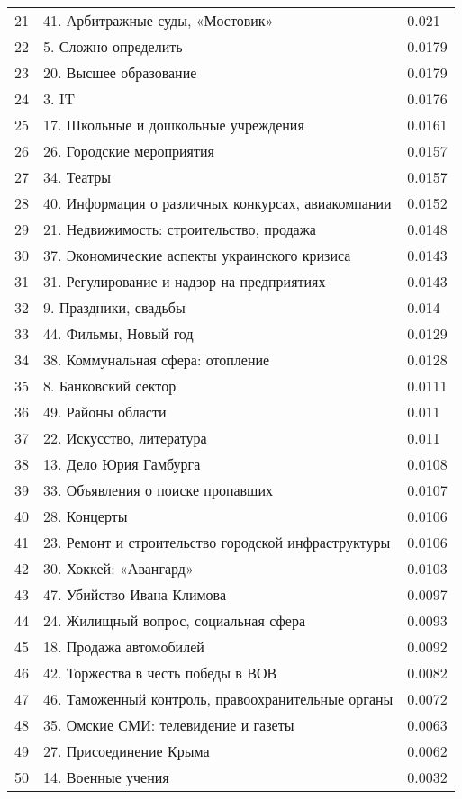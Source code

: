 \begin{longtable}[c]{| L{3cm} | C{7cm} | R{5cm} |}
		21 & 41. Арбитражные суды, «Мостовик» & 0.021 \\
		22 & 5. Сложно определить & 0.0179 \\
		23 & 20. Высшее образование & 0.0179 \\
		24 & 3. IT & 0.0176 \\
		25 & 17. Школьные и дошкольные учреждения & 0.0161 \\
		26 & 26. Городские мероприятия & 0.0157 \\
		27 & 34. Театры & 0.0157 \\
		28 & 40. Информация о различных конкурсах, авиакомпании & 0.0152 \\
		29 & 21. Недвижимость: строительство, продажа & 0.0148 \\
		30 & 37. Экономические аспекты украинского кризиса & 0.0143 \\
		31 & 31. Регулирование и надзор на предприятиях & 0.0143 \\
		32 & 9. Праздники, свадьбы & 0.014 \\
		33 & 44. Фильмы, Новый год & 0.0129 \\
		34 & 38. Коммунальная сфера: отопление & 0.0128 \\
		35 & 8. Банковский сектор & 0.0111 \\
		36 & 49. Районы области & 0.011 \\
		37 & 22. Искусство, литература & 0.011 \\
		38 & 13. Дело Юрия Гамбурга & 0.0108 \\
		39 & 33. Объявления о поиске пропавших & 0.0107 \\
		40 & 28. Концерты & 0.0106 \\
		41 & 23. Ремонт и строительство городской инфраструктуры & 0.0106 \\
		42 & 30. Хоккей: «Авангард» & 0.0103 \\
		43 & 47. Убийство Ивана Климова & 0.0097 \\
		44 & 24. Жилищный вопрос, социальная сфера & 0.0093 \\
		45 & 18. Продажа автомобилей & 0.0092 \\
		46 & 42. Торжества в честь победы в ВОВ & 0.0082 \\
		47 & 46. Таможенный контроль, правоохранительные органы & 0.0072 \\
		48 & 35. Омские СМИ: телевидение и газеты & 0.0063 \\
		49 & 27. Присоединение Крыма & 0.0062 \\
		50 & 14. Военные учения & 0.0032 \\
	\hline
\end{longtable}




